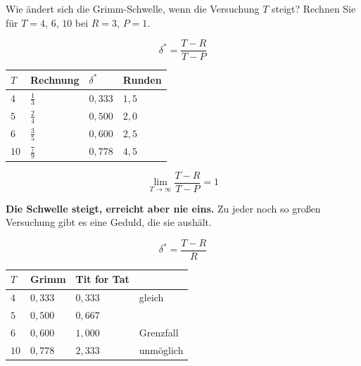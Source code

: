 \begin{aufgabe}
Wie ändert sich die Grimm-Schwelle, wenn die Versuchung $T$ steigt? Rechnen Sie für $T = 4$, $6$, $10$ bei $R=3$, $P=1$.

\loesung
{}
\[ \delta^{*} = \frac{T-R}{T-P} \]

\begin{center}
{\small
\renewcommand{\arraystretch}{1.5}
\begin{tabular}{@{}P{1.4cm}P{2.4cm}P{1.8cm}P{2.2cm}@{}}
\toprule
$T$ & \textbf{Rechnung} & $\delta^{*}$ & \textbf{Runden}\\
\midrule
$4$ & $\tfrac{1}{3}$ & $0{,}333$ & $1{,}5$\\
$5$ & $\tfrac{2}{4}$ & $0{,}500$ & $2{,}0$\\
$6$ & $\tfrac{3}{5}$ & $0{,}600$ & $2{,}5$\\
$10$ & $\tfrac{7}{9}$ & $0{,}778$ & $4{,}5$\\
\bottomrule
\end{tabular}}
\end{center}

\[ \lim_{T\to\infty} \frac{T-R}{T-P} = 1 \]

\begin{center}
\begin{minipage}{0.9\textwidth}
\textbf{Die Schwelle steigt, erreicht aber nie eins.} Zu jeder noch so großen Versuchung gibt es eine Geduld, die sie aushält.
\end{minipage}
\end{center}

\[ \delta^{*} = \frac{T-R}{R} \]
\begin{center}
{\small
\renewcommand{\arraystretch}{1.5}
\begin{tabular}{@{}P{1.4cm}P{2.0cm}P{2.0cm}P{2.2cm}@{}}
\toprule
$T$ & \textbf{Grimm} & \textbf{Tit for Tat} & \\
\midrule
$4$ & $0{,}333$ & $0{,}333$ & gleich\\
$5$ & $0{,}500$ & $0{,}667$ & \\
$6$ & $0{,}600$ & $1{,}000$ & \textcolor{mittel}{Grenzfall}\\
$10$ & $0{,}778$ & $2{,}333$ & \textcolor{akzent}{unmöglich}\\
\bottomrule
\end{tabular}}
\end{center}


\end{aufgabe}
